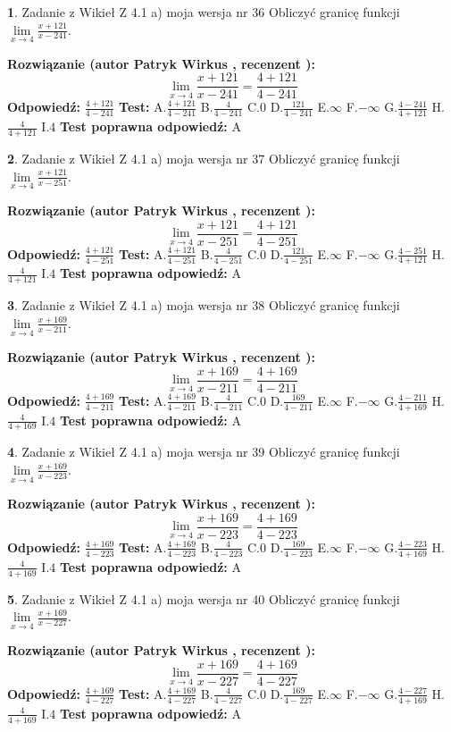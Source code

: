 \documentclass[12pt, a4paper]{article}
\theoremstyle{definition} %
\newtheorem{zad}{}
\newcommand{\zadStart}[1]{\begin{zad}#1\newline}
\newcommand{\zadStop}{\end{zad}}
\newcommand{\rozwStart}[2]{\noindent \textbf{Rozwiązanie (autor #1 , recenzent #2): }\newline}
\newcommand{\rozwStop}{\newline}
\newcommand{\odpStart}{\noindent \textbf{Odpowiedź:}\newline}
\newcommand{\odpStop}{\newline}
\newcommand{\testStart}{\noindent \textbf{Test:}\newline}
\newcommand{\testStop}{\newline}
\newcommand{\kluczStart}{\noindent \textbf{Test poprawna odpowiedź:}\newline}
\newcommand{\kluczStop}{\newline}
\begin{document}
\zadStart{Zadanie z Wikieł Z 4.1 a) moja wersja nr 36}
Obliczyć granicę funkcji $\lim\limits_{x\to4}\frac{x+121}{x-241}$.
\zadStop
\rozwStart{Patryk Wirkus}{}
$$\lim\limits_{x\to4}\frac{x+121}{x-241} = \frac{4+121}{4-241}$$
\rozwStop
\odpStart
$\frac{4+121}{4-241}$
\odpStop
\testStart
A.$\frac{4+121}{4-241}$
B.$\frac{4}{4-241}$
C.$0$
D.$\frac{121}{4-241}$
E.$\infty$
F.$-\infty$
G.$\frac{4-241}{4+121}$
H.$\frac{4}{4+121}$
I.$4$
\testStop
\kluczStart
A
\kluczStop



\zadStart{Zadanie z Wikieł Z 4.1 a) moja wersja nr 37}
Obliczyć granicę funkcji $\lim\limits_{x\to4}\frac{x+121}{x-251}$.
\zadStop
\rozwStart{Patryk Wirkus}{}
$$\lim\limits_{x\to4}\frac{x+121}{x-251} = \frac{4+121}{4-251}$$
\rozwStop
\odpStart
$\frac{4+121}{4-251}$
\odpStop
\testStart
A.$\frac{4+121}{4-251}$
B.$\frac{4}{4-251}$
C.$0$
D.$\frac{121}{4-251}$
E.$\infty$
F.$-\infty$
G.$\frac{4-251}{4+121}$
H.$\frac{4}{4+121}$
I.$4$
\testStop
\kluczStart
A
\kluczStop



\zadStart{Zadanie z Wikieł Z 4.1 a) moja wersja nr 38}
Obliczyć granicę funkcji $\lim\limits_{x\to4}\frac{x+169}{x-211}$.
\zadStop
\rozwStart{Patryk Wirkus}{}
$$\lim\limits_{x\to4}\frac{x+169}{x-211} = \frac{4+169}{4-211}$$
\rozwStop
\odpStart
$\frac{4+169}{4-211}$
\odpStop
\testStart
A.$\frac{4+169}{4-211}$
B.$\frac{4}{4-211}$
C.$0$
D.$\frac{169}{4-211}$
E.$\infty$
F.$-\infty$
G.$\frac{4-211}{4+169}$
H.$\frac{4}{4+169}$
I.$4$
\testStop
\kluczStart
A
\kluczStop



\zadStart{Zadanie z Wikieł Z 4.1 a) moja wersja nr 39}
Obliczyć granicę funkcji $\lim\limits_{x\to4}\frac{x+169}{x-223}$.
\zadStop
\rozwStart{Patryk Wirkus}{}
$$\lim\limits_{x\to4}\frac{x+169}{x-223} = \frac{4+169}{4-223}$$
\rozwStop
\odpStart
$\frac{4+169}{4-223}$
\odpStop
\testStart
A.$\frac{4+169}{4-223}$
B.$\frac{4}{4-223}$
C.$0$
D.$\frac{169}{4-223}$
E.$\infty$
F.$-\infty$
G.$\frac{4-223}{4+169}$
H.$\frac{4}{4+169}$
I.$4$
\testStop
\kluczStart
A
\kluczStop



\zadStart{Zadanie z Wikieł Z 4.1 a) moja wersja nr 40}
Obliczyć granicę funkcji $\lim\limits_{x\to4}\frac{x+169}{x-227}$.
\zadStop
\rozwStart{Patryk Wirkus}{}
$$\lim\limits_{x\to4}\frac{x+169}{x-227} = \frac{4+169}{4-227}$$
\rozwStop
\odpStart
$\frac{4+169}{4-227}$
\odpStop
\testStart
A.$\frac{4+169}{4-227}$
B.$\frac{4}{4-227}$
C.$0$
D.$\frac{169}{4-227}$
E.$\infty$
F.$-\infty$
G.$\frac{4-227}{4+169}$
H.$\frac{4}{4+169}$
I.$4$
\testStop
\kluczStart
A
\kluczStop
\end{document}
